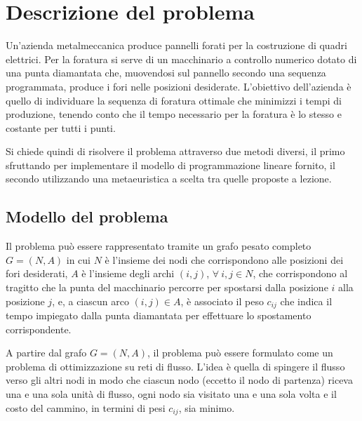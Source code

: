 \section{Descrizione del problema}
Un'azienda metalmeccanica produce pannelli forati per la costruzione di quadri elettrici.
Per la foratura si serve di un macchinario a controllo numerico dotato di una punta diamantata che, muovendosi sul pannello secondo una sequenza programmata, produce i fori nelle posizioni desiderate.
L'obiettivo dell'azienda è quello di individuare la sequenza di foratura ottimale che minimizzi i tempi di produzione, tenendo conto che il tempo necessario per la foratura è lo stesso e costante per tutti i punti.

Si chiede quindi di risolvere il problema attraverso due metodi diversi, il primo sfruttando  per implementare il modello di programmazione lineare fornito, il secondo utilizzando una metaeuristica a scelta tra quelle proposte a lezione.

\subsection{Modello del problema}
Il problema può essere rappresentato tramite un grafo pesato completo $G = (N, A)$ in cui $N$ è l'insieme dei nodi che corrispondono alle posizioni dei fori desiderati, $A$ è l'insieme degli archi $(i, j)$, $\forall\ i, j \in N$, che corrispondono al tragitto che la punta del macchinario percorre per spostarsi dalla posizione $i$ alla posizione $j$, e, a ciascun arco $(i, j) \in A$, è associato il peso $c_{ij}$ che indica il tempo impiegato dalla punta diamantata per effettuare lo spostamento corrispondente.

A partire dal grafo $G = (N, A)$, il problema può essere formulato come un problema di ottimizzazione su reti di flusso.
L'idea è quella di spingere il flusso verso gli altri nodi in modo che ciascun nodo (eccetto il nodo di partenza) riceva una e una sola unità di flusso, ogni nodo sia visitato una e una sola volta e il costo del cammino, in termini di pesi $c_{ij}$, sia minimo.

